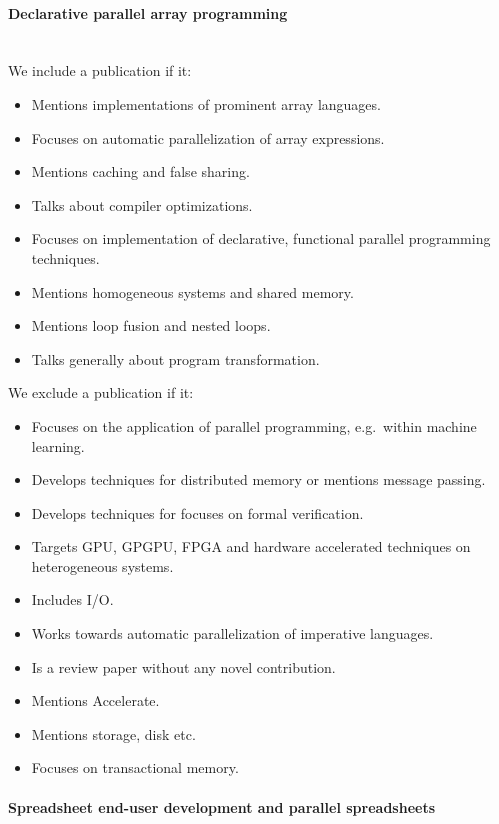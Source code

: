 \documentclass[a4paper]{article}
\begin{document}
\paragraph{Declarative parallel array programming}
~\\

We include a publication if it:

\begin{itemize}
\item Mentions implementations of prominent array languages.
\item Focuses on automatic parallelization of array expressions.
\item Mentions caching and false sharing.
\item Talks about compiler optimizations.
\item Focuses on implementation of declarative, functional parallel
  programming techniques.
\item Mentions homogeneous systems and shared memory.
\item Mentions loop fusion and nested loops.
\item Talks generally about program transformation.
\end{itemize}

We exclude a publication if it:

\begin{itemize}
\item Focuses on the application of parallel programming, e.g.\ within
  machine learning.
\item Develops techniques for distributed memory or mentions message
  passing.
\item Develops techniques for focuses on formal verification.
\item Targets GPU, GPGPU, FPGA and hardware accelerated techniques on
  heterogeneous systems.
\item Includes I/O.
\item Works towards automatic parallelization of imperative languages.
\item Is a review paper without any novel contribution.
\item Mentions Accelerate.
\item Mentions storage, disk etc.
\item Focuses on transactional memory.
\end{itemize}

\paragraph{Spreadsheet end-user development and parallel spreadsheets}
~\\
\end{document}
